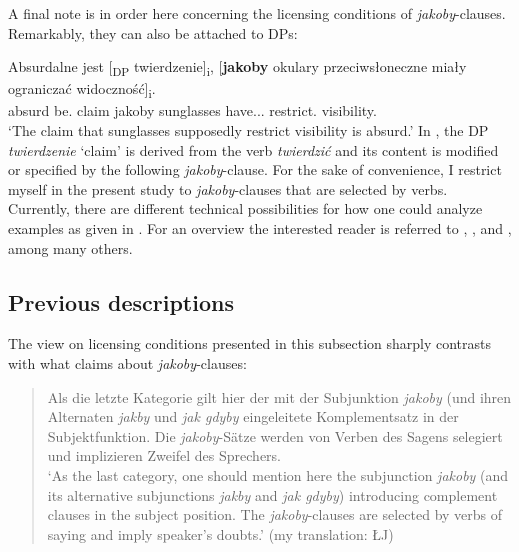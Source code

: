 \documentclass[output=paper
,modfonts
,nonflat]{langsci/langscibook}
\begin{document}
A final note is in order here concerning the licensing conditions of \emph{jakoby}-clauses. Remarkably, they can also be attached to DPs: 

\ea \gll Absurdalne jest [\textsubscript{DP} twierdzenie]\textsubscript{i}, [\textbf{jakoby} {okulary przeciwsłoneczne} miały ograniczać widoczność]\textsubscript{i}. \label{DP} \\ 
		absurd be.{\thirdperson}{\sg} {} claim jakoby sunglasses have.{\lptcp}.{\nvir}.{\pl}  restrict.{\infv} visibility.{\acc} \\
\glt	`The claim that sunglasses supposedly restrict visibility is absurd.'   
\z
In , the DP \emph{twierdzenie} `claim' is derived from the verb \emph{twierdzić} and its content is modified or specified by the following \emph{jakoby}-clause. For the sake of convenience, I restrict myself in the present study to \emph{jakoby}-clauses that are selected by verbs. Currently, there are different technical possibilities for how one could analyze examples as given in . For an overview the interested reader is referred to \textcite{Moulton2009}, \textcite{Haegeman-Urogdi2010}, and \textcite{deCuba2017}, among many others.   

\subsection{Previous descriptions}

The view on licensing conditions presented in this subsection sharply contrasts with what \textcite[110--115, 156--157]{Taborek2008} claims about \emph{jakoby}-clauses:

\begin{quote}
Als die letzte Kategorie gilt hier der mit der Subjunktion \emph{jakoby} (und ihren Alternaten \emph{jakby} und \emph{jak gdyby} eingeleitete Komplementsatz in der Subjekt\-funktion. Die \emph{jakoby}-Sätze werden von Verben des Sagens selegiert und implizieren Zweifel des Sprechers. \\ `As the last category, one should mention here the subjunction \emph{jakoby} (and its alternative subjunctions \emph{jakby} and \emph{jak gdyby}) introducing complement clauses in the subject position. The \emph{jakoby}-clauses are selected by verbs of saying and imply speaker's doubts.' (my translation: ŁJ)   \newline \textcite[100--101]{Taborek2008}
\end{quote}
\end{document}
